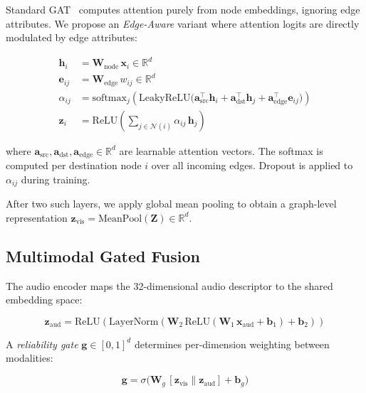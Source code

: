 \documentclass[conference]{IEEEtran}
\begin{document}
Standard GAT~\cite{Velickovic2018} computes attention purely from node embeddings, 
ignoring edge attributes. We propose an \textit{Edge-Aware} variant where attention 
logits are directly modulated by edge attributes:

\begin{align}
  \mathbf{h}_i &= \mathbf{W}_{\text{node}}\,\mathbf{x}_i \in \mathbb{R}^{d}
  \label{eq:node_proj} \\
  \mathbf{e}_{ij} &= \mathbf{W}_{\text{edge}}\,w_{ij} \in \mathbb{R}^{d}
  \label{eq:edge_proj} \\
  \alpha_{ij} &= \text{softmax}_j\!\left(
    \text{LeakyReLU}\bigl(
      \mathbf{a}_{\text{src}}^{\top}\mathbf{h}_i + 
      \mathbf{a}_{\text{dst}}^{\top}\mathbf{h}_j + 
      \mathbf{a}_{\text{edge}}^{\top}\mathbf{e}_{ij}
    \bigr)
  \right)
  \label{eq:attn} \\
  \mathbf{z}_i &= \text{ReLU}\!\left(\sum_{j \in \mathcal{N}(i)} \alpha_{ij}\,\mathbf{h}_j\right)
  \label{eq:agg}
\end{align}

where $\mathbf{a}_{\text{src}}, \mathbf{a}_{\text{dst}}, \mathbf{a}_{\text{edge}} \in \mathbb{R}^{d}$ 
are learnable attention vectors. The softmax is computed per destination node $i$ over 
all incoming edges. Dropout is applied to $\alpha_{ij}$ during training.

After two such layers, we apply global mean pooling to obtain a 
graph-level representation $\mathbf{z}_{\text{vis}} = \text{MeanPool}(\mathbf{Z}) \in \mathbb{R}^{d}$.

\subsection{Multimodal Gated Fusion}
\label{sec:fusion}

The audio encoder maps the 32-dimensional audio descriptor to the shared embedding space:

\begin{equation}
  \mathbf{z}_{\text{aud}} = \text{ReLU}(\text{LayerNorm}(\mathbf{W}_2\,
    \text{ReLU}(\mathbf{W}_1\,\mathbf{x}_{\text{aud}} + \mathbf{b}_1) + \mathbf{b}_2))
  \label{eq:audio_enc}
\end{equation}

A \textit{reliability gate} $\mathbf{g} \in [0,1]^{d}$ determines per-dimension 
weighting between modalities:

\begin{equation}
  \mathbf{g} = \sigma\bigl(\mathbf{W}_g\,[\mathbf{z}_{\text{vis}} \| \mathbf{z}_{\text{aud}}]
    + \mathbf{b}_g\bigr)
  \label{eq:gate}
\end{equation}
\end{document}
